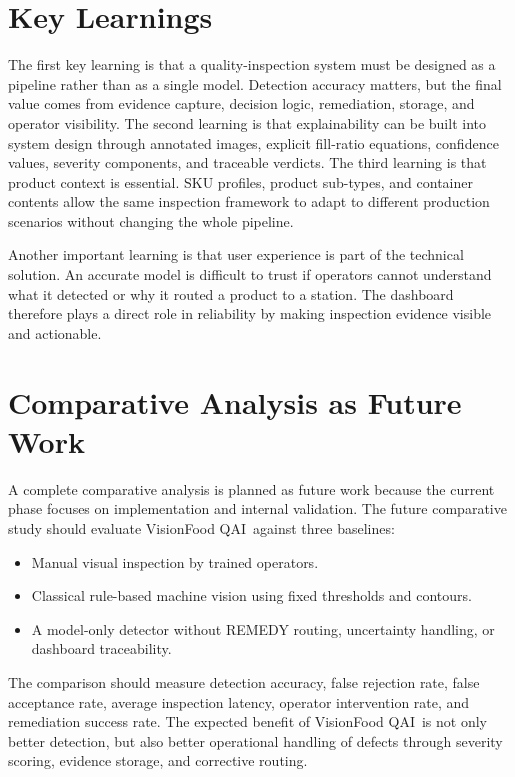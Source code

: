 \documentclass[12pt,a4paper]{report}
\newcommand{\shorttitle}{VisionFood QAI}
\begin{document}
\section{Key Learnings}
\label{sec:key-learnings}

The first key learning is that a quality-inspection system must be designed as a pipeline rather than as a single model. Detection accuracy matters, but the final value comes from evidence capture, decision logic, remediation, storage, and operator visibility. The second learning is that explainability can be built into system design through annotated images, explicit fill-ratio equations, confidence values, severity components, and traceable verdicts. The third learning is that product context is essential. SKU profiles, product sub-types, and container contents allow the same inspection framework to adapt to different production scenarios without changing the whole pipeline.

Another important learning is that user experience is part of the technical solution. An accurate model is difficult to trust if operators cannot understand what it detected or why it routed a product to a station. The dashboard therefore plays a direct role in reliability by making inspection evidence visible and actionable.

\section{Comparative Analysis as Future Work}
\label{sec:future-comparative-analysis}

A complete comparative analysis is planned as future work because the current phase focuses on implementation and internal validation. The future comparative study should evaluate \shorttitle\ against three baselines:
\begin{itemize}
  \item Manual visual inspection by trained operators.
  \item Classical rule-based machine vision using fixed thresholds and contours.
  \item A model-only detector without REMEDY routing, uncertainty handling, or dashboard traceability.
\end{itemize}

The comparison should measure detection accuracy, false rejection rate, false acceptance rate, average inspection latency, operator intervention rate, and remediation success rate. The expected benefit of \shorttitle\ is not only better detection, but also better operational handling of defects through severity scoring, evidence storage, and corrective routing.
\end{document}
